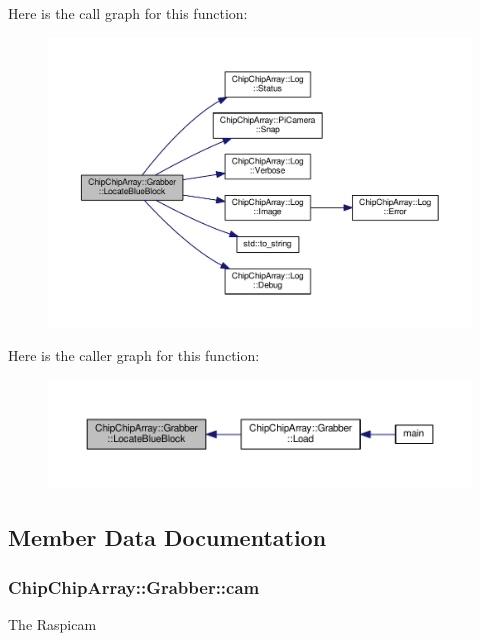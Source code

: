 Here is the call graph for this function\+:
\nopagebreak
\begin{figure}[H]
\begin{center}
\leavevmode
\includegraphics[width=350pt]{classChipChipArray_1_1Grabber_ab9b0d6a64b2c94c0d0f810a5ebeef6ec_cgraph}
\end{center}
\end{figure}




Here is the caller graph for this function\+:
\nopagebreak
\begin{figure}[H]
\begin{center}
\leavevmode
\includegraphics[width=350pt]{classChipChipArray_1_1Grabber_ab9b0d6a64b2c94c0d0f810a5ebeef6ec_icgraph}
\end{center}
\end{figure}




\subsection{Member Data Documentation}
\hypertarget{classChipChipArray_1_1Grabber_a726bcc2367a719cb84de92a981947622}{
\subsubsection[{cam}]{ Chip\+Chip\+Array\+::\+Grabber\+::cam\hspace{0.3cm}{\ttfamily [protected]}}}\label{classChipChipArray_1_1Grabber_a726bcc2367a719cb84de92a981947622}
The Raspicam 


